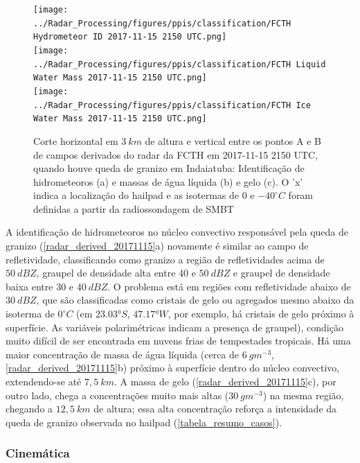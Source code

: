 \begin{figure}[htb]
	\centering
	\caption{Corte horizontal em $3\:km$ de altura e vertical entre os pontos A e B de campos derivados do radar da FCTH em 2017-11-15 2150 UTC, quando houve queda de granizo em Indaiatuba: Identificação de hidrometeoros (a) e massas de água líquida (b) e gelo (c). O 'x' indica a localização do hailpad e as isotermas de $0$ e $-40^{\circ}C$ foram definidas a partir da radiossondagem de SMBT} 
	\label{radar_derived_20171115}
	\vspace{-5pt}
	\texttt{[image: ../Radar\_Processing/figures/ppis/classification/FCTH Hydrometeor ID 2017-11-15 2150 UTC.png]} \\
	\vspace{-5pt}
	\texttt{[image: ../Radar\_Processing/figures/ppis/classification/FCTH Liquid Water Mass 2017-11-15 2150 UTC.png]} \\
	\vspace{-5pt}
	\texttt{[image: ../Radar\_Processing/figures/ppis/classification/FCTH Ice Water Mass 2017-11-15 2150 UTC.png]} \\
\end{figure}

A identificação de hidrometeoros no núcleo convectivo responsável pela queda de granizo (\autoref{radar_derived_20171115}a) novamente é similar ao campo de refletividade, classificando como granizo a região de refletividades acima de $50\:dBZ$, graupel de densidade alta entre 40 e $50\:dBZ$ e graupel de densidade baixa entre 30 e $40\:dBZ$. O problema está em regiões com refletividade abaixo de $30\:dBZ$, que são classificadas como cristais de gelo ou agregados mesmo abaixo da isoterma de $0^{\circ}C$ (em $\ang{23.03}S$, $\ang{47.17}W$, por exemplo, há cristais de gelo próximo à superfície. As variáveis polarimétricas indicam a presença de graupel), condição muito difícil de ser encontrada em nuvens frias de tempestades tropicais. Há uma maior concentração de massa de água líquida (cerca de $6\:gm^{-3}$, \autoref{radar_derived_20171115}b) próximo à superfície dentro do núcleo convectivo, extendendo-se até $7,5\:km$. A massa de gelo (\autoref{radar_derived_20171115}c), por outro lado, chega a concentrações muito mais altas ($30\:gm^{-3}$)  na mesma região, chegando a $12,5\:km$ de altura; essa alta concentração reforça a intensidade da queda de granizo observada no hailpad (\autoref{tabela_resumo_casos}).

\subsubsection{Cinemática}\label{cinematica_20171115}

